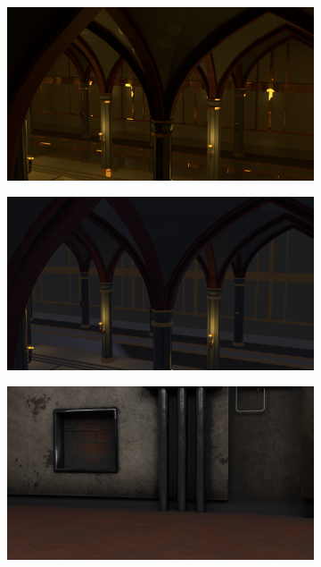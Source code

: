 \begin{figure}
    \centering
    \begin{subfigure}{0.24\linewidth}
        \centering
         \includegraphics[width=\textwidth]{figures/methods/dataset_compare/diff_riflessi_cycles.png}
         \caption{}
         \label{fig:rendering_dataset_diff_riflessi_cycles}
    \end{subfigure}
    \hfill
    \begin{subfigure}{0.24\linewidth}
        \centering
         \includegraphics[width=\textwidth]{figures/methods/dataset_compare/diff_riflessi_eevee.png}
         \caption{}
         \label{fig:rendering_dataset_diff_riflessi_eevee}
    \end{subfigure}
    \hfill
    \begin{subfigure}{0.24\linewidth}
        \centering
         \includegraphics[width=\textwidth]{figures/methods/dataset_compare/piccole_differenze_cycles.png}

\end{subfigure}
\end{figure}
